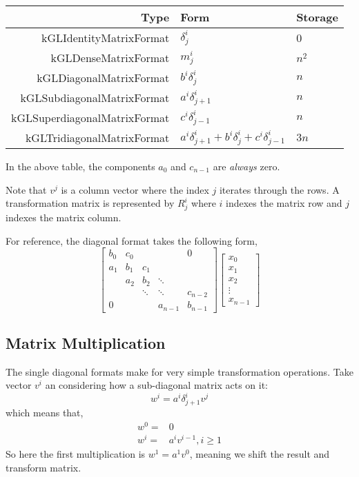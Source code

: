 \documentclass[11pt]{article}
\begin{document}
\begin{tabular}{r l l}
\hline
 Type & Form & Storage \\
\hline
  kGLIdentityMatrixFormat & $\delta^i_j$ & 0 \\
  kGLDenseMatrixFormat & $m^i_j$ & $n^2$  \\
  kGLDiagonalMatrixFormat & $b^i \delta^i_j$ & $n$ \\
  kGLSubdiagonalMatrixFormat & $a^i \delta^i_{j+1}$ & $n$ \\
  kGLSuperdiagonalMatrixFormat & $c^i \delta^i_{j-1}$ & $n$ \\
  kGLTridiagonalMatrixFormat & $a^i \delta^i_{j+1} + b^i \delta^i_j + c^i \delta^i_{j-1}$ & $3n$ \\
\hline
\end{tabular}

In the above table, the components $a_0$ and $c_{n-1}$ are \emph{always} zero.

Note that $v^j$ is a column vector where the index $j$ iterates through the rows. A transformation matrix is represented by $R^i_j$ where $i$ indexes the matrix row and $j$ indexes the matrix column.

For reference, the diagonal format takes the following form,
\begin{equation}
\left[\begin{array}{ccccc}b_0 & c_0 &  &  & 0 \\a_1 & b_1 & c_1 &  &  \\ & a_2 & b_2 & \ddots &  \\ &  & \ddots  & \ddots  & c_{n-2} \\0 &  &  & a_{n-1} & b_{n-1}\end{array}\right] \left[\begin{array}{c}x_0 \\x_1 \\x_2 \\ \vdots \\x_{n-1}\end{array}\right]
\end{equation}

\subsection{Matrix Multiplication}

The single diagonal formats make for very simple transformation operations. Take vector $v^i$ an considering how a sub-diagonal matrix acts on it:
\begin{equation}
w^i = a^i \delta^i_{j+1} v^j
\end{equation}
which means that,
\begin{align}
w^0 =& 0 \\
w^i = & a^i v^{i-1}, i \geqslant 1
\end{align}
So here the first multiplication is $w^1 = a^1 v^0$, meaning we shift the result and transform matrix.
\end{document}
